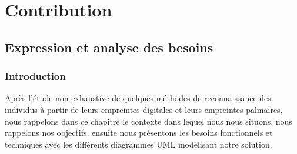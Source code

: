 \part{Contribution}
\chapter{Expression et analyse des besoins }
\label{analyse}
\section{Introduction}
	\tab Après l’étude non exhaustive de quelques méthodes de reconnaissance des individus à partir de leurs empreintes digitales et leurs empreintes palmaires, nous rappelons dans ce chapitre le contexte dans lequel nous nous situons, nous rappelons nos objectifs, ensuite nous présentons les besoins fonctionnels et techniques avec les différents diagrammes UML modélisant notre solution.
